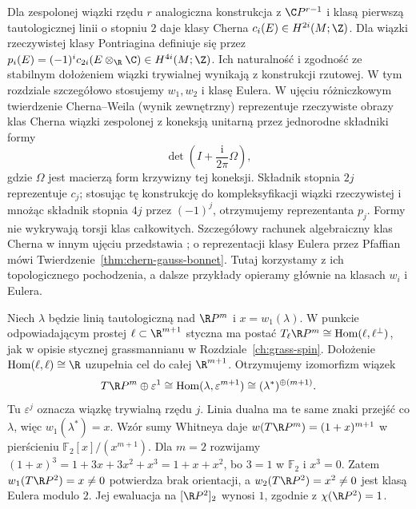 \begin{uwaga}
Dla zespolonej wiązki
rzędu $r$ analogiczna
konstrukcja z
$\C P^{r-1}$
i klasą pierwszą
tautologicznej linii
o stopniu $2$
daje klasy Cherna
$c_i(E)\in H^{2i}(M;\Z)$.
Dla wiązki rzeczywistej
klasy Pontriagina
definiuje się przez
$p_i(E)=(-1)^i
c_{2i}(E\otimes_\R\C)
\in H^{4i}(M;\Z)$.
Ich naturalność i
zgodność ze stabilnym
dołożeniem wiązki
trywialnej wynikają
z konstrukcji rzutowej.
W tym rozdziale
szczegółowo stosujemy
$w_1,w_2$ i klasę
Eulera. W ujęciu różniczkowym twierdzenie Cherna--Weila
(wynik zewnętrzny) reprezentuje rzeczywiste obrazy klas
Cherna wiązki zespolonej z koneksją unitarną przez
jednorodne składniki formy
\[
 \det\left(I+\frac{\mathrm i}{2\pi}\Omega\right),
\]
gdzie $\Omega$ jest macierzą form krzywizny tej koneksji.
Składnik stopnia $2j$ reprezentuje $c_j$; stosując
tę konstrukcję do kompleksyfikacji wiązki rzeczywistej
i mnożąc składnik stopnia $4j$ przez $(-1)^j$,
otrzymujemy reprezentanta $p_j$.
Formy nie wykrywają torsji klas całkowitych.
Szczegółowy rachunek algebraiczny klas Cherna w innym
ujęciu przedstawia
;
o reprezentacji klasy Eulera przez Pfaffian mówi
Twierdzenie~\ref{thm:chern-gauss-bonnet}.
Tutaj korzystamy z ich topologicznego pochodzenia,
a dalsze przykłady opieramy głównie na klasach $w_i$ i Eulera.
\end{uwaga}

\begin{przyklad}
\label{prz:sw-rp2-21}
Niech $\lambda$ będzie linią tautologiczną nad $\R P^m$
i $x=w_1(\lambda)$.
W punkcie odpowiadającym prostej $\ell\subset\R^{m+1}$
styczna ma postać
$T_\ell\R P^m\cong\operatorname{Hom}(\ell,\ell^\perp)$,
jak w opisie stycznej grassmannianu w Rozdziale~\ref{ch:grass-spin}.
Dołożenie $\operatorname{Hom}(\ell,\ell)\cong\R$
uzupełnia cel do całej $\R^{m+1}$.
Otrzymujemy izomorfizm wiązek
\[
 T\R P^m\oplus\varepsilon^1
 \cong\operatorname{Hom}(\lambda,\varepsilon^{m+1})
 \cong(\lambda^*)^{\oplus(m+1)}.
\]
Tu $\varepsilon^j$ oznacza wiązkę trywialną rzędu $j$.
Linia dualna ma te same znaki przejść co $\lambda$,
więc $w_1(\lambda^*)=x$.
Wzór sumy Whitneya daje
$w(T\R P^m)=(1+x)^{m+1}$
w pierścieniu $\mathbb F_2[x]/(x^{m+1})$.
Dla $m=2$ rozwijamy
$(1+x)^3=1+3x+3x^2+x^3=1+x+x^2$,
bo $3=1$ w $\mathbb F_2$ i $x^3=0$.
Zatem $w_1(T\R P^2)=x\ne0$ potwierdza brak orientacji,
a $w_2(T\R P^2)=x^2\ne0$ jest klasą Eulera modulo $2$.
Jej ewaluacja na $[\R P^2]_2$ wynosi $1$,
zgodnie z $\chi(\R P^2)=1$.
\end{przyklad}

